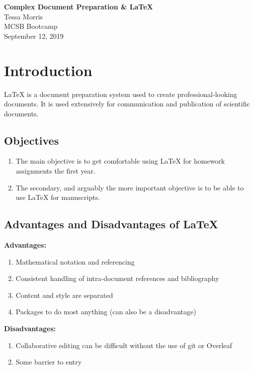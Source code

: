 \documentclass{article}
\begin{document}
\thispagestyle{empty} %
\begin{center}
    \Large
    \textbf{Complex Document Preparation \& LaTeX}\\
    \normalsize
    Tessa Morris\\
    MCSB Bootcamp\\
    September 12, 2019
\end{center}

\tableofcontents %
\newpage %

\section{Introduction}
LaTeX is a document preparation system used to create professional-looking documents. It is used extensively for communication and publication of scientific documents.

\subsection{Objectives}
\begin{enumerate}
    \item The main objective is to get comfortable using LaTeX for homework assignments the first year.
    \item The secondary, and arguably the more important objective is to be able to use LaTeX for manuscripts. 
\end{enumerate}

\subsection{Advantages and Disadvantages of LaTeX}
\textbf{Advantages:}
\begin{enumerate}
    \item Mathematical notation and referencing
    \item Consistent handling of intra-document references and bibliography
    \item Content and style are separated 
    \item Packages to do most anything (can also be a disadvantage)
\end{enumerate}
\textbf{Disadvantages:}
\begin{enumerate}
    \item Collaborative editing can be difficult without the use of git or Overleaf
    \item Some barrier to entry 
\end{enumerate}
\end{document}

